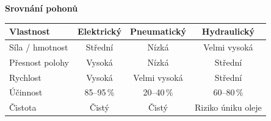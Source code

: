 \documentclass[a4paper,10pt]{article}
\begin{document}
\begin{vysvetlenibox}
\textbf{Srovnání pohonů}

\begin{center}
\begin{tabular}{@{} l c c c @{}}
    \toprule
    \textbf{Vlastnost} & \textbf{Elektrický}
                       & \textbf{Pneumatický} & \textbf{Hydraulický} \\
    \midrule
    Síla / hmotnost & Střední & Nízká & Velmi vysoká \\
    Přesnost polohy & Vysoká & Nízká & Střední \\
    Rychlost        & Vysoká & Velmi vysoká & Střední \\
    Účinnost        & 85--95\,\% & 20--40\,\% & 60--80\,\% \\
    Čistota         & Čistý & Čistý & Riziko úniku oleje \\
    \bottomrule
\end{tabular}
\end{center}
\end{vysvetlenibox}


\end{document}
